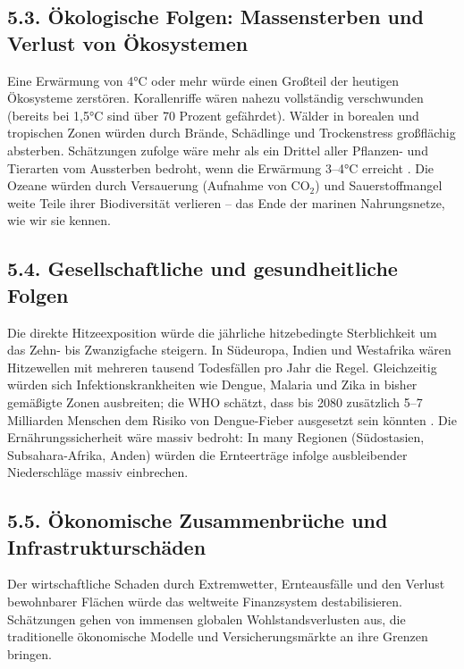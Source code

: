\documentclass[12pt, a4paper]{article}
\begin{document}
	\subsection*{5.3. Ökologische Folgen: Massensterben und Verlust von Ökosystemen}
	Eine Erwärmung von 4°C oder mehr würde einen Großteil der heutigen Ökosysteme zerstören.
	Korallenriffe wären nahezu vollständig verschwunden (bereits bei 1,5°C sind über 70 Prozent gefährdet).
	Wälder in borealen und tropischen Zonen würden durch Brände, Schädlinge und Trockenstress großflächig absterben.
	Schätzungen zufolge wäre mehr als ein Drittel aller Pflanzen- und Tierarten vom Aussterben bedroht, wenn die Erwärmung 3–4°C erreicht \cite{ipcc2021}.
	Die Ozeane würden durch Versauerung (Aufnahme von CO$_2$) und Sauerstoffmangel weite Teile ihrer Biodiversität verlieren – das Ende der marinen Nahrungsnetze, wie wir sie kennen.
	
	\subsection*{5.4. Gesellschaftliche und gesundheitliche Folgen}
	Die direkte Hitzeexposition würde die jährliche hitzebedingte Sterblichkeit um das Zehn- bis Zwanzigfache steigern.
	In Südeuropa, Indien und Westafrika wären Hitzewellen mit mehreren tausend Todesfällen pro Jahr die Regel.
	Gleichzeitig würden sich Infektionskrankheiten wie Dengue, Malaria und Zika in bisher gemäßigte Zonen ausbreiten;
	die WHO schätzt, dass bis 2080 zusätzlich 5–7 Milliarden Menschen dem Risiko von Dengue-Fieber ausgesetzt sein könnten \cite{lancet2025}.
	Die Ernährungssicherheit wäre massiv bedroht: In many Regionen (Südostasien, Subsahara-Afrika, Anden) würden die Ernteerträge infolge ausbleibender Niederschläge massiv einbrechen.
	
	\subsection*{5.5. Ökonomische Zusammenbrüche und Infrastrukturschäden}
	Der wirtschaftliche Schaden durch Extremwetter, Ernteausfälle und den Verlust bewohnbarer Flächen würde das weltweite Finanzsystem destabilisieren. Schätzungen gehen von immensen globalen Wohlstandsverlusten aus, die traditionelle ökonomische Modelle und Versicherungsmärkte an ihre Grenzen bringen.
	
\end{document}
